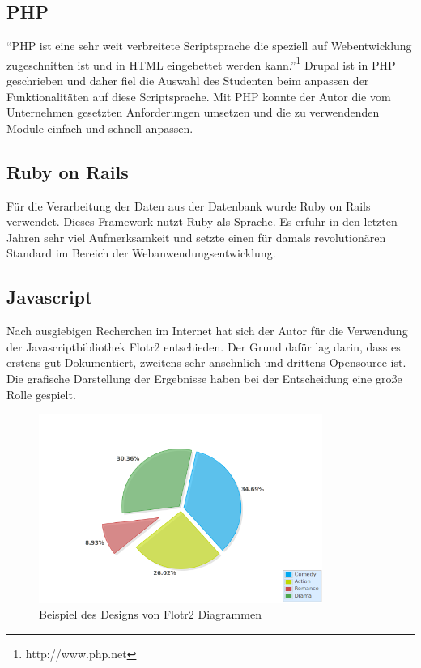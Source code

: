 \subsection{PHP}
``PHP ist eine sehr weit verbreitete Scriptsprache die speziell auf Webentwicklung zugeschnitten ist und in HTML eingebettet werden kann.''\footnote{http://www.php.net}
Drupal ist in PHP geschrieben und daher fiel die Auswahl des Studenten beim anpassen der Funktionalitäten auf diese Scriptsprache. Mit PHP konnte der Autor die vom Unternehmen gesetzten Anforderungen umsetzen und die zu verwendenden Module einfach und schnell anpassen.
\subsection{Ruby on Rails}
Für die Verarbeitung der Daten aus der Datenbank wurde Ruby on Rails verwendet. 
Dieses Framework nutzt Ruby als Sprache. Es erfuhr in den letzten Jahren sehr viel Aufmerksamkeit und setzte einen für damals revolutionären Standard im Bereich der Webanwendungsentwicklung.\citep{graver}
\subsection{Javascript}
Nach ausgiebigen Recherchen im Internet hat sich der Autor für die Verwendung der Javascriptbibliothek Flotr2 entschieden. Der Grund dafür lag darin, dass es erstens gut Dokumentiert,  zweitens sehr ansehnlich und drittens Opensource ist. Die grafische Darstellung der Ergebnisse haben bei der Entscheidung eine große Rolle gespielt.
\begin{figure}[htbp]
 \centering
 \includegraphics[width=350px]{./material/pie_chart.png}
 \caption{Beispiel des Designs von Flotr2 Diagrammen}
 \label{fig:pie_chart_flotr}
\end{figure}

